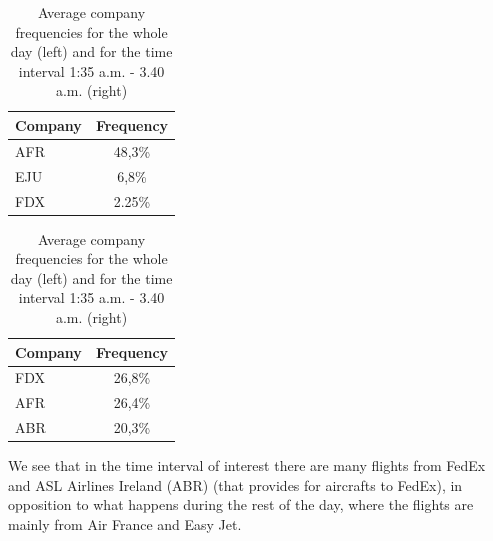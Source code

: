 \documentclass{article}
\begin{document}
\begin{table}[h!!!!!!!!!!!!!!!!]
	\begin{center}
		\caption{Average company frequencies for the whole day (left) and for the time interval 1:35 a.m. - 3.40 a.m. (right)}
		\label{tab:table1}
		\begin{tabular}{l|c} %
			\textbf{Company} & \textbf{Frequency}\\
			\hline
			AFR & 48,3\% \\
			EJU & 6,8\% \\
			FDX & 2.25\% \\
		\end{tabular}
	\quad \quad \quad \quad
		\begin{tabular}{l|c} %
		\textbf{Company} & \textbf{Frequency}\\
		\hline
		FDX & 26,8\% \\
		AFR & 26,4\% \\
		ABR & 20,3\% \\
		\end{tabular}
	\end{center}
\end{table}

\newpage
We see that in the time interval of interest there are many flights from FedEx and ASL Airlines Ireland (ABR) (that provides for aircrafts to FedEx), in opposition to what happens during the rest of the day, where the flights are mainly from Air France and Easy Jet. 
\end{document}
